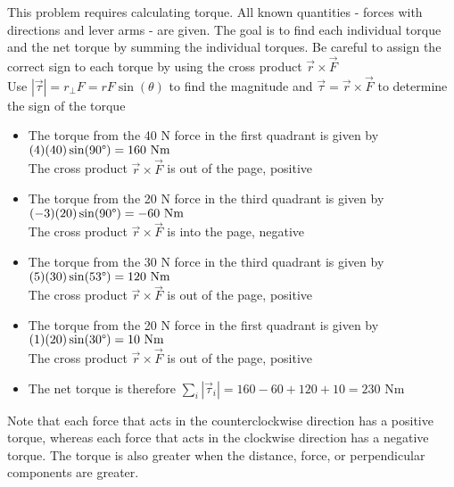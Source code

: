 \documentclass[a4paper]{article}
\newcommand\Nm{\text{ Nm}}
\begin{document}
\begin{shaded}
\begin{center}
    \end{center}
    This problem requires calculating torque. All known quantities - forces with directions and lever arms - are given. The goal is to find each individual torque and the net torque by summing the individual torques. Be careful to assign the correct sign to each torque by using the cross product $\vec{r}\times\vec{F}$
    \vspace{1mm}\\
    Use $|\vec{\tau}| = r_{\perp}F = rF\sin(\theta)$ to find the magnitude and $\vec{\tau} = \vec{r}\times\vec{F}$ to determine the sign of the torque
    \begin{itemize}
        \item The torque from the 40 N force in the first quadrant is given by $(4)(40)\sin(90\degree) = 160\Nm$\\
        The cross product $\vec{r}\times\vec{F}$ is out of the page, positive
        \item The torque from the 20 N force in the third quadrant is given by $(-3)(20)\sin(90\degree) = -60\Nm$\\
        The cross product $\vec{r}\times\vec{F}$ is into the page, negative
        \item The torque from the 30 N force in the third quadrant is given by $(5)(30)\sin(53\degree) = 120\Nm$\\
        The cross product $\vec{r}\times\vec{F}$ is out of the page, positive
        \item The torque from the 20 N force in the first quadrant is given by $(1)(20)\sin(30\degree) = 10\Nm$\\
        The cross product $\vec{r}\times\vec{F}$ is out of the page, positive
        \item The net torque is therefore $\displaystyle \sum_{i}|\vec{\tau}_i| = 160 - 60 + 120 + 10 = 230\Nm$
    \end{itemize}
    Note that each force that acts in the counterclockwise direction has a positive torque, whereas each force that acts in the clockwise direction has a negative torque. The torque is also greater when the distance, force, or perpendicular components are greater.
\end{shaded}
\end{document}
